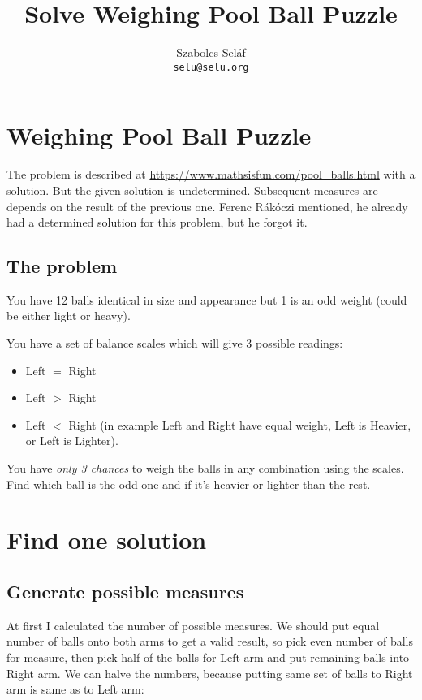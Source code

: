 \documentclass[11pt]{article} %
\title{Solve Weighing Pool Ball Puzzle}
\author{Szabolcs Seláf \\ \texttt{selu@selu.org}}
\begin{document}
\maketitle

\section{Weighing Pool Ball Puzzle}

The problem is described at \url{https://www.mathsisfun.com/pool_balls.html} with a solution. But the given solution is undetermined. Subsequent measures are depends on the result of the previous one. Ferenc Rákóczi mentioned, he already had a determined solution for this problem, but he forgot it.

\subsection{The problem}

You have 12 balls identical in size and appearance but 1 is an odd weight (could be either light or heavy).

You have a set of balance scales which will give 3 possible readings:

\begin{itemize}
\item Left $=$ Right
\item Left $>$ Right
\item Left $<$ Right (in example Left and Right have equal weight, Left is Heavier, or Left is Lighter).
\end{itemize}

You have \emph{only 3 chances} to weigh the balls in any combination using the scales.
Find which ball is the odd one and if it's heavier or lighter than the rest.

\section{Find one solution}

\subsection{Generate possible measures} \label{one_solution}

At first I calculated the number of possible measures. We should put equal number of balls onto both arms to get a valid result, so pick even number of balls for measure, then pick half of the balls for Left arm and put remaining balls into Right arm. We can halve the numbers, because putting same set of balls to Right arm is same as to Left arm:
\end{document}
